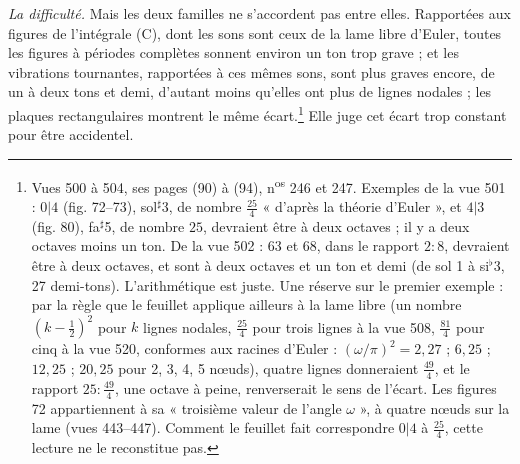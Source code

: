 \documentclass[11pt,a4paper]{article}
\begin{document}
\emph{La difficulté.} Mais les deux familles ne s'accordent pas entre elles.
Rapportées aux figures de l'intégrale (C), dont les sons sont ceux de la lame
libre d'Euler, toutes les figures à périodes complètes sonnent environ un ton
trop grave ; et les vibrations tournantes, rapportées à ces mêmes sons, sont
plus graves encore, de un à deux tons et demi, d'autant moins qu'elles ont plus
de lignes nodales ; les plaques rectangulaires montrent le même
écart.\footnote{Vues 500 à 504, ses pages (90) à (94), n\textsuperscript{os}
246 et 247. Exemples de la vue 501 : $0|4$ (fig. 72--73), sol$^{\sharp}$3, de
nombre $\frac{25}{4}$ « d'après la théorie d'Euler », et $4|3$ (fig. 80),
fa$^{\sharp}$5, de nombre $25$, devraient être à deux octaves ; il y a deux
octaves moins un ton. De la vue 502 : 63 et 68, dans le rapport $2:8$, devraient
être à deux octaves, et sont à deux octaves et un ton et demi (de sol 1 à
si$^{\flat}$3, 27 demi-tons). L'arithmétique est juste. Une réserve sur le
premier exemple : par la règle que le feuillet applique ailleurs à la lame
libre (un nombre $(k-\frac12)^2$ pour $k$ lignes nodales, $\frac{25}{4}$ pour
trois lignes à la vue 508, $\frac{81}{4}$ pour cinq à la vue 520, conformes aux
racines d'Euler : $(\omega/\pi)^2 = 2{,}27$ ; $6{,}25$ ; $12{,}25$ ; $20{,}25$
pour 2, 3, 4, 5 nœuds), quatre lignes donneraient $\frac{49}{4}$, et le rapport
$25 : \frac{49}{4}$, une octave à peine, renverserait le sens de l'écart. Les
figures 72 appartiennent à sa « troisième valeur de l'angle $\omega$ », à
quatre nœuds sur la lame (vues 443--447). Comment le feuillet fait correspondre
$0|4$ à $\frac{25}{4}$, cette lecture ne le reconstitue pas.} Elle juge cet
écart trop constant pour être accidentel.
\end{document}

